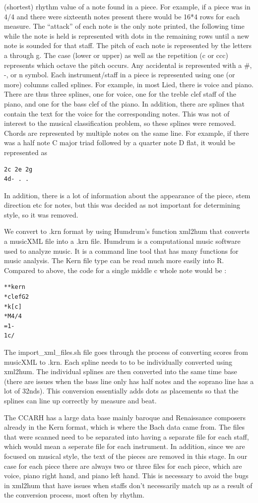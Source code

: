 \documentclass[12pt,twoside]{reedthesis}
\theoremstyle{definition}
\theoremstyle{definition}
\theoremstyle{definition}
\theoremstyle{remark}
\begin{document}
(shortest) rhythm value of a note found in a piece. For example, if a
piece was in 4/4 and there were sixteenth notes present there would be
16*4 rows for each measure. The ``attack'' of each note is the only note
printed, the following time while the note is held is represented with
dots in the remaining rows until a new note is sounded for that staff.
The pitch of each note is represented by the letters a through g. The
case (lower or upper) as well as the repetition (c or ccc) represents
which octave the pitch occurs. Any accidental is represented with a \#,
-, or n symbol. Each instrument/staff in a piece is represented using
one (or more) columns called splines. For example, in most Lied, there
is voice and piano. There are thus three splines, one for voice, one for
the treble clef staff of the piano, and one for the bass clef of the
piano. In addition, there are splines that contain the text for the
voice for the corresponding notes. This was not of interest to the
musical classification problem, so these splines were removed. Chords
are represented by multiple notes on the same line. For example, if
there was a half note C major triad followed by a quarter note D flat,
it would be represented as
\begin{verbatim}
2c 2e 2g
4d- . . 
\end{verbatim}
In addition, there is a lot of information about the appearance of the
piece, stem direction etc for notes, but this was decided as not
important for determining style, so it was removed.

We convert to .krn format by using Humdrum's function xml2hum that
converts a musicXML file into a .krn file. Humdrum is a computational
music software used to analyze music. It is a command line tool that has
many functions for music analysis. The Kern file type can be read much
more easily into R. Compared to above, the code for a single middle c
whole note would be :
\begin{verbatim}
**kern
*clefG2
*k[c]
*M4/4
=1-
1c/
\end{verbatim}
The import\_xml\_files.sh file goes through the process of converting
scores from musicXML to .krn. Each spline needs to to be individually
converted using xml2hum. The individual splines are then converted into
the same time base (there are issues when the bass line only has half
notes and the soprano line has a lot of 32nds). This conversion
essentially adds dots as placements so that the splines can line up
correctly by measure and beat.

The CCARH has a large data base mainly baroque and Renaissance composers
already in the Kern format, which is where the Bach data came from. The
files that were scanned need to be separated into having a separate file
for each staff, which would mean a seperate file for each instrument. In
addition, since we are focused on musical style, the text of the pieces
are removed in this stage. In our case for each piece there are always
two or three files for each piece, which are voice, piano right hand,
and piano left hand. This is necessary to avoid the bugs in xml2hum that
have issues when staffs don't necessarily match up as a result of the
conversion process, most often by rhythm.
\end{document}
